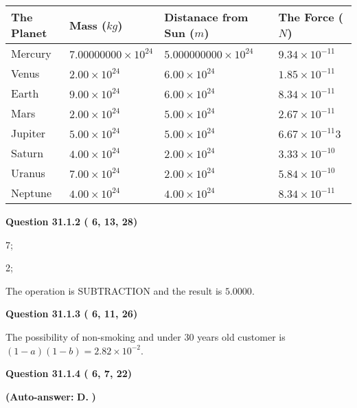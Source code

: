 \documentclass[12pt]{article}
\begin{document}
 
\begin{tabular}{|l|l|l|l|}
\hline
The Planet & Mass ($kg$) & Distanace from Sun ($m$) & The Force ($N$)\\
\hline
Mercury  &
           $ %
7.00000000 \times 10^{24}  $   &
             $ %
5.000000000 \times 10^{24}$    & $ %
9.34 \times 10^{-11} $
\\  \hline
Venus    &
           $  %
2.00 \times 10^{24}  $     &
             $ %
6.00 \times 10^{24} $    & $ %
1.85 \times 10^{-11} $
\\  \hline
Earth    &
           $  %
9.00 \times 10^{24}$     &
             $ %
6.00 \times 10^{24} $    & $ %
8.34 \times 10^{-11} $
\\   \hline
Mars     &
           $  %
2.00 \times 10^{24} $     &
             $ %
5.00 \times 10^{24}$    & $ %
2.67 \times 10^{-11} $
\\   \hline
Jupiter  &
           $  %
5.00 \times 10^{24}  $    &
             $ %
5.00 \times 10^{24} $    & $ %
6.67 \times 10^{-11}3 $
\\  \hline
Saturn   &
           $  %
4.00 \times 10^{24}   $    &
             $ %
2.00 \times 10^{24}  $    & $ %
3.33 \times 10^{-10} $
\\  \hline
Uranus   &
           $  %
7.00 \times 10^{24} $    &
             $ %
2.00 \times 10^{24}$    & $ %
5.84 \times 10^{-10} $
\\  \hline
Neptune  &
           $  %
4.00 \times 10^{24}  $    &
             $ %
4.00 \times 10^{24} $    & $ %
8.34 \times 10^{-11} $
\\  \hline
 
\end{tabular}
 
 
  
  
{\textbf{\large{Question
31.1.2 
 (          6,         13,         28)
}}}

7;
 
2;
 
The operation is  %
SUBTRACTION and the result is
$ %
5.0000$.
 
  
  
{\textbf{\large{Question
31.1.3 
 (          6,         11,         26)
}}}

The possibility of  %
 non-smoking and  %
under 30 years old
customer is $ (1-a)(1-b) =  %
2.82 \times 10^{-2} $.
  
  
{\textbf{\large{Question
31.1.4 
 (          6,          7,         22)
}}}
 
 
{\textbf{(Auto-answer:}}
{\textbf{\large{
D.}}}
{\textbf{)}}
 
\end{document}

